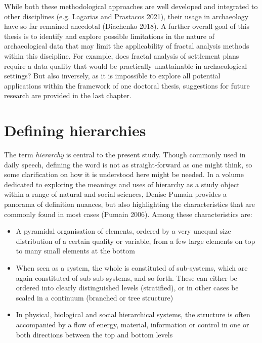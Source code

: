 \documentclass[
  12pt,
]{book}
\begin{document}
While both these methodological approaches are well developed and integrated to other disciplines (e.g. Lagarias and Prastacos 2021), their usage in archaeology have so far remained anecdotal (Diachenko 2018). A further overall goal of this thesis is to identify and explore possible limitations in the nature of archaeological data that may limit the applicability of fractal analysis methods within this discipline. For example, does fractal analysis of settlement plans require a data quality that would be practically unattainable in archaeological settings? But also inversely, as it is impossible to explore all potential applications within the framework of one doctoral thesis, suggestions for future research are provided in the last chapter.

\hypertarget{defining-hierarchies}{%
\section{Defining hierarchies}\label{defining-hierarchies}}

The term \emph{hierarchy} is central to the present study. Though commonly used in daily speech, defining the word is not as straight-forward as one might think, so some clarification on how it is understood here might be needed. In a volume dedicated to exploring the meanings and uses of hierarchy as a study object within a range of natural and social sciences, Denise Pumain provides a panorama of definition nuances, but also highlighting the characteristics that are commonly found in most cases (Pumain 2006). Among these characteristics are:

\begin{itemize}
\item
  A pyramidal organisation of elements, ordered by a very unequal size distribution of a certain quality or variable, from a few large elements on top to many small elements at the bottom
\item
  When seen as a system, the whole is constituted of sub-systems, which are again constituted of sub-sub-systems, and so forth. These can either be ordered into clearly distinguished levels (stratified), or in other cases be scaled in a continuum (branched or tree structure)
\item
  In physical, biological and social hierarchical systems, the structure is often accompanied by a flow of energy, material, information or control in one or both directions between the top and bottom levels
\end{itemize}
\end{document}
